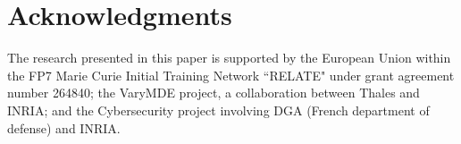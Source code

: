 \documentclass[runningheads,a4paper]{llncs}
\begin{document}



%



%



\section*{Acknowledgments}
The research presented in this paper is supported by the European Union within the FP7 Marie Curie Initial Training Network ``RELATE" under grant agreement number 264840; the VaryMDE project, a collaboration between Thales and INRIA; and the Cybersecurity project involving DGA (French department of defense) and INRIA.



\end{document}
